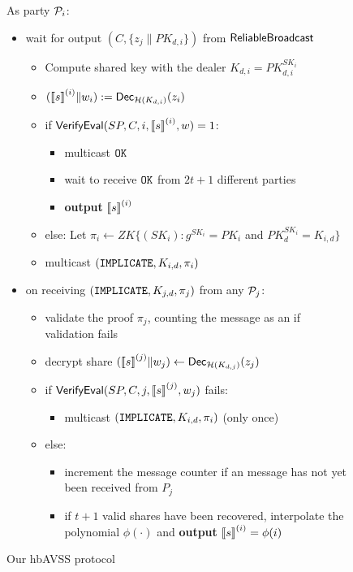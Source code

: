 \documentclass{sig-alternate-05-2015}
\begin{document}
\begin{figure}
\begin{boxedminipage}{\columnwidth}
As party $\P_i$:
\begin{itemize}
\item wait for output $(C,\{z_j \| PK_{d,i} \})$ from $\msf{ReliableBroadcast}$
  \begin{itemize}
  \item Compute shared key with the dealer \(K_{d,i} = PK_{d,i}^{SK_{i}}\)
  \item $(\share{s}^{(i)} \| w_i) := \msf{Dec}_{\hash(K_{d,i})}(z_i)$
  \item if $\msf{VerifyEval}(SP, C, i, \share{s}^{(i)}, w) = 1$:
    \begin{itemize}
    \item multicast $\mtt{OK}$
    \item wait to receive $\mtt{OK}$ from $2t+1$ different parties
    \item \textbf{output} $\share{s}^{(i)}$
    \end{itemize}
  \item else: Let $\pi_i \leftarrow ZK\{(SK_i):g^{SK_i} = PK_i$ and $PK_d^{SK_i} = K_{i,d}\}$
  \item multicast $(\mtt{IMPLICATE}, {K_{i,d}}, {\pi_i})$
  \end{itemize}

\item on receiving $(\mtt{IMPLICATE}, {K_{j,d}}, {\pi_j})$ from any $\P_j$:
  \begin{itemize}
  \item validate the proof $\pi_j$, counting the message as an  if validation fails
  \item decrypt share $(\share{s}^{(j)} \| w_j) \leftarrow \msf{Dec}_{\hash(K_{d,j})}(z_j)$
  \item if $\msf{VerifyEval}( SP, C, j, \share{s}^{(j)}, w_j )$ fails:
    \begin{itemize}
      \item multicast $(\mtt{IMPLICATE}, {K_{i,d}}, {\pi_i})$  (only once)
    \end{itemize}
  \item else:
    \begin{itemize}
    \item increment the  message counter if an  message has not yet been received from $P_j$
    \item if $t+1$ valid shares have been recovered,  interpolate the polynomial $\phi(\cdot)$ and \textbf{output} $\share{s}^{(i)} = \phi(i)$
    \end{itemize}
  \end{itemize}
\end{itemize}

\end{boxedminipage}
\caption{Our hbAVSS protocol}
\label{alg:hbavss}
\end{figure}
\end{document}
